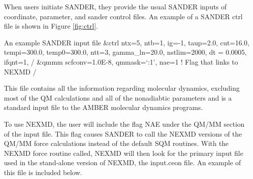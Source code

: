 When users initiate SANDER, they provide the usual SANDER inputs of coordinate,
parameter, and sander control files. An example of a SANDER ctrl file is shown in Figure
\ref{fig:ctrl}.

   \lstset{frame=single}
   \begin{mylisting}
     An example SANDER input file
     &ctrl
       ntx=5,
       ntb=1,
       ig=-1,
       taup=2.0,
       cut=16.0,
       tempi=300.0,
       temp0=300.0,
       ntt=3,
       gamma_ln=20.0,
       nstlim=2000,
       dt = 0.0005,
       ifqnt=1,
     /
     &qmmm
       scfconv=1.0E-8,
       qmmask=`:1',
       nae=1 ! Flag that links to NEXMD
     /
   \end{mylisting}
   \label{fig:ctrl}
   \bigskip
   \setlength\parindent{24pt}
This file contains all the information regarding molecular dynamics, excluding most of the QM
calculations and all of the nonadiabtic parameters and is a standard input file to the AMBER
molecular dynamics programs.

To use NEXMD, the user will include the flag NAE under the QM/MM section of the input
file. This flag causes SANDER to call the NEXMD versions of the QM/MM force calculations instead of the default SQM routines. With the NEXMD force routine called, NEXMD will then look for the primary input file used in the stand-alone version of NEXMD, the input.ceon file. An example of this file is included below.

